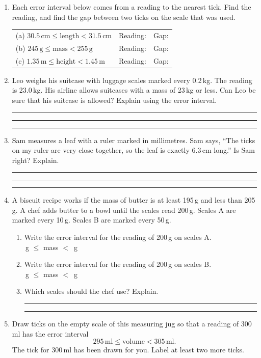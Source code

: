 \documentclass[11pt,a4paper]{article}
\newcommand{\ansline}[1][2.2cm]{\underline{\hspace{#1}}}
\newcommand{\wline}{\par\vspace{15pt}\noindent\rule{\linewidth}{0.4pt}}
\begin{document}
\begin{enumerate}[resume]
\item Each error interval below comes from a reading to the nearest tick. Find
the reading, and find the gap between two ticks on the scale that was used.

\smallskip
\renewcommand{\arraystretch}{1.8}
\begin{tabular}{@{}l@{\qquad}l@{\qquad}l@{}}
(a) $30.5\,\text{cm}\le\text{length}<31.5\,\text{cm}$ & Reading: \ansline[1.8cm] & Gap: \ansline[1.8cm]\\
(b) $245\,\text{g}\le\text{mass}<255\,\text{g}$ & Reading: \ansline[1.8cm] & Gap: \ansline[1.8cm]\\
(c) $1.35\,\text{m}\le\text{height}<1.45\,\text{m}$ & Reading: \ansline[1.8cm] & Gap: \ansline[1.8cm]
\end{tabular}

\item Leo weighs his suitcase with luggage scales marked every 0.2\,kg. The
reading is 23.0\,kg. His airline allows suitcases with a mass of 23\,kg or
less. Can Leo be sure that his suitcase is allowed? Explain using the error
interval.
\wline\wline\wline

\item Sam measures a leaf with a ruler marked in millimetres. Sam says, ``The
ticks on my ruler are very close together, so the leaf is exactly 6.3\,cm
long.'' Is Sam right? Explain.
\wline\wline\wline

\newpage
\item A biscuit recipe works if the mass of butter is at least 195\,g and less
than 205\,g. A chef adds butter to a bowl until the scales read 200\,g. Scales
A are marked every 10\,g. Scales B are marked every 50\,g.
\begin{enumerate}
\item Write the error interval for the reading of 200\,g on scales A.\\[4pt]
\ansline[1.6cm]\,g $\le$ mass $<$ \ansline[1.6cm]\,g
\item Write the error interval for the reading of 200\,g on scales B.\\[4pt]
\ansline[1.6cm]\,g $\le$ mass $<$ \ansline[1.6cm]\,g
\item Which scales should the chef use? Explain.
\wline\wline
\end{enumerate}

\item \begin{minipage}[t]{0.68\linewidth}
Draw ticks on the empty scale of this measuring jug so that a reading of
300\,ml has the error interval
\[295\,\text{ml}\le\text{volume}<305\,\text{ml}.\]
The tick for 300\,ml has been drawn for you. Label at least two more ticks.


\end{minipage}
\end{enumerate}
\end{document}

